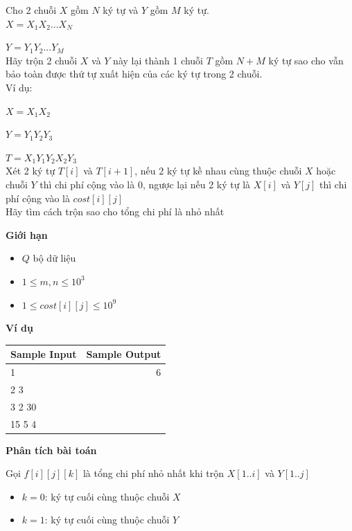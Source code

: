 \documentclass{article}
\begin{document}
\begin{tcolorbox}[
    colback=blue!5,        %
    colframe=blue!75!black,%
    title={Đề bài}
]
Cho 2 chuỗi $X$ gồm $N$ ký tự và $Y$ gồm $M$ ký tự. \\

$X = X_1 X_2 ... X_N$

$Y = Y_1 Y_2 ... Y_M$\\

Hãy trộn 2 chuỗi $X$ và $Y$ này lại thành 1 chuỗi $T$ gồm $N + M$ ký tự sao cho vẫn bảo toàn được thứ tự xuất hiện của các ký tự trong 2 chuỗi. \\

Ví dụ:

$X = X_1 X_2$

$Y = Y_1 Y_2 Y_3$

$T = X_1 Y_1 Y_2 X_2 Y_3$ \\

Xét 2 ký tự $T[i]$ và $T[i + 1]$, nếu 2 ký tự kề nhau cùng thuộc chuỗi $X$ hoặc chuỗi $Y$ thì chi phí cộng vào là 0, ngược lại nếu 2 ký tự là $X[i]$ và $Y[j]$ thì chi phí cộng vào là $cost[i][j]$ \\

Hãy tìm cách trộn sao cho tổng chi phí là nhỏ nhất
\end{tcolorbox}

\textbf{Giới hạn}
\begin{itemize}
    \item $Q$ bộ dữ liệu 
    \item $1 \leq m, n \leq 10^3$
    \item $1 \leq cost[i][j] \leq 10^9$
\end{itemize}

\textbf{Ví dụ}

\begin{table}[h]
    \centering
    \begin{tabular}{|l|r|}
        \hline
        \textbf{Sample Input} & \textbf{Sample Output} \\
        \hline
		1 & 6\\ 
		2 3&  \\
        3 2 30 & \\
        15 5 4 & \\ 
		\hline
    \end{tabular}
\end{table}

\textbf{Phân tích bài toán}

Gọi $f[i][j][k]$ là tổng chi phí nhỏ nhất khi trộn $X[1..i]$ và $Y[1..j]$
\begin{itemize}
    \item $k = 0$: ký tự cuối cùng thuộc chuỗi $X$
    \item $k = 1$: ký tự cuối cùng thuộc chuỗi $Y$
\end{itemize} 
\end{document}
